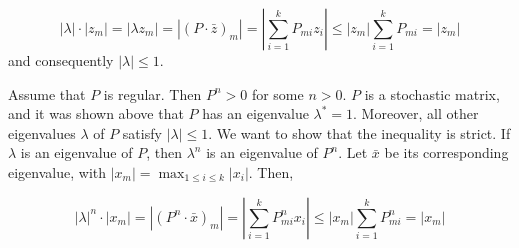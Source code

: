 \documentclass{tufte-handout}
\begin{document}
    
    \[
    |\lambda| \cdot |z_m| = |\lambda z_m| = |(P \cdot \bar{z})_m| = \left| \sum_{i=1}^{k} P_{mi} z_i 
    \right| \leq |z_m| \sum_{i=1}^{k} P_{mi} = |z_m|
    \]
    and consequently $|\lambda| \leq 1$.

    Assume that $P$ is regular. Then $P^n > 0$ for some $n > 0$. $P$ is a stochastic matrix, 
    and it was shown above that $P$ has an eigenvalue $\lambda^* = 1$. Moreover, all other 
    eigenvalues $\lambda$ of $P$ satisfy $|\lambda| \leq 1$. We want to show that the 
    inequality is strict. If $\lambda$ is an eigenvalue of $P$, then $\lambda^n$ is an 
    eigenvalue of $P^n$. Let $\bar{x}$ be its corresponding eigenvalue, with $|x_m| = 
    \max_{1 \leq i \leq k} |x_i|$. Then,


    \[
    |\lambda|^n \cdot |x_m| = |(P^n \cdot \bar{x})_m| = \left| \sum_{i=1}^{k} P^n_{mi} x_i \right| 
    \leq |x_m| \sum_{i=1}^{k} P^n_{mi} = |x_m|
    \]
\end{document}

